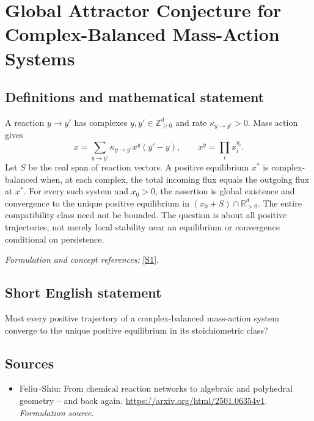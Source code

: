 \documentclass[11pt]{article}
\begin{document}
\section*{\texorpdfstring{Global Attractor Conjecture for Complex-Balanced Mass-Action Systems}{Global Attractor Conjecture for Complex-Balanced Mass-Action Systems}}\label{30006844}
\subsection{Definitions and mathematical statement}
A reaction $y\to y'$ has complexes $y,y'\in{\mathbb{Z}}_{\ge0}^d$ and rate $\kappa_{y\to y'}>0$. Mass action gives
\[
 \dot x=\sum_{y\to y'}\kappa_{y\to y'}x^y(y'-y),\qquad
 x^y=\prod_i x_i^{y_i}.
\]
Let $S$ be the real span of reaction vectors. A positive equilibrium $x^*$ is complex-balanced when, at each complex, the total incoming flux equals the outgoing flux at $x^*$. For every such system and $x_0>0$, the assertion is global existence and convergence to the unique positive equilibrium in
$(x_0+S)\cap{\mathbb{R}}_{>0}^d$. The entire compatibility class need not be bounded. The question is about all positive trajectories, not merely local stability near an equilibrium or convergence conditional on persistence.
\par\smallskip\textit{Formulation and concept references:} \href{https://arxiv.org/html/2501.06354v1}{[S1]}.

\subsection{Short English statement}
Must every positive trajectory of a complex-balanced mass-action system converge to the unique positive equilibrium in its stoichiometric class?
\subsection{Sources}
\begin{itemize}
\item[S1]Feliu–Shiu: From chemical reaction networks to algebraic and polyhedral geometry – and back again.
\url{https://arxiv.org/html/2501.06354v1}.
\textit{Formulation source.}
\end{itemize}
\end{document}
